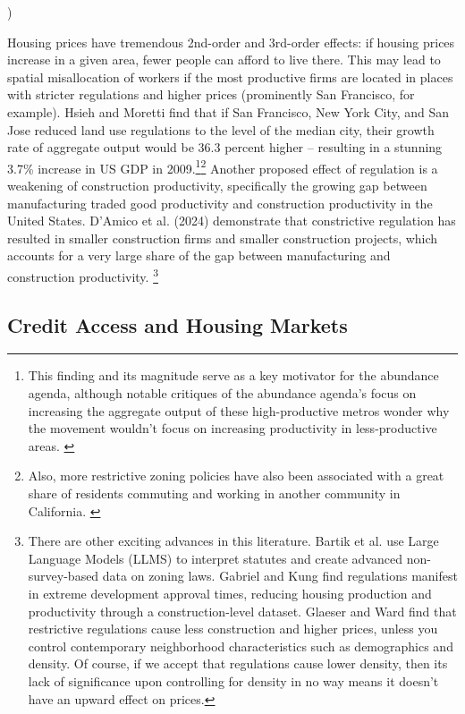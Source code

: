 )\documentclass{article}[11pt]
\begin{document}
Housing prices have tremendous 2nd-order and 3rd-order effects: if housing prices increase in a given area, fewer people can afford to live there. This may lead to spatial misallocation of workers if the most productive firms are located in places with stricter regulations and higher prices (prominently San Francisco, for example). Hsieh and Moretti find that if San Francisco, New York City, and San Jose reduced land use regulations to the level of the median city, their growth rate of aggregate output would be 36.3 percent higher -- resulting in a stunning 3.7\% increase in US GDP in 2009.\footnote{This finding and its magnitude serve as a key motivator for the abundance agenda, although notable critiques of the abundance agenda's focus on increasing the aggregate output of these high-productive metros wonder why the movement wouldn't focus on increasing productivity in less-productive areas. \citep{abundanceambiguity}}\footnote{Also, more restrictive zoning policies have also been associated with a great share of residents commuting and working in another community in California. \citep{durst2021land}}  \citep{hsieh2019housing} Another proposed effect of regulation is a weakening of construction productivity, specifically the growing gap between manufacturing traded good productivity and construction productivity in the United States. D'Amico et al. (2024) demonstrate that constrictive regulation has resulted in smaller construction firms and smaller construction projects, which accounts for a very large share of the gap between manufacturing and construction productivity. \citep{d2024has} \footnote{There are other exciting advances in this literature. Bartik et al. use Large Language Models (LLMS) to interpret statutes and create advanced non-survey-based data on zoning laws. \citep{bartik2024costs} Gabriel and Kung find regulations manifest in extreme development approval times, reducing housing production and productivity through a construction-level dataset. \citep{gabriel2024development} Glaeser and Ward find that restrictive regulations cause less construction and higher prices, unless you control contemporary neighborhood characteristics such as demographics and density. \citep{glaeser2009causes} Of course, if we accept that regulations cause lower density, then its lack of significance upon controlling for density in no way means it doesn't have an upward effect on prices.}

	\subsection{Credit Access and Housing Markets}
	
\end{document}
